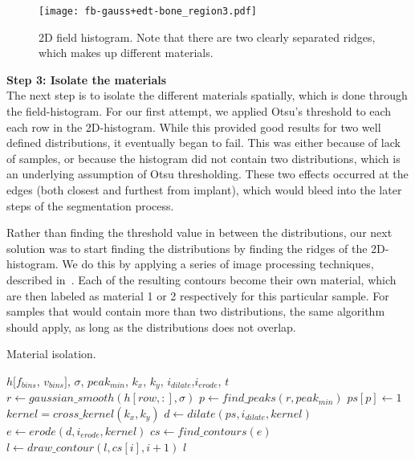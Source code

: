 \begin{figure}
    \texttt{[image: fb-gauss+edt-bone\_region3.pdf]}
    \caption{2D field histogram. Note that there are two clearly separated ridges, which makes up
    different materials.}
    \label{fig:field-hist}
\end{figure}

\vspace{\baselineskip}
\noindent\textbf{Step 3: Isolate the materials} \\
The next step is to isolate the different materials spatially, which is done through the field-histogram.
For our first attempt, we applied Otsu's threshold to each each row in the 2D-histogram. While this
provided good results for two well defined distributions, it eventually began to fail. This was either
because of lack of samples, or because the histogram did not contain two distributions, which is an
underlying assumption of Otsu thresholding. These two effects occurred at the edges (both closest and
furthest from implant), which would bleed into the later steps of the segmentation process.

Rather than finding the threshold value in between the distributions, our next solution was to start
finding the distributions by finding the ridges of the 2D-histogram. We do this by applying a series
of image processing techniques, described in~. Each of the resulting contours
become their own material, which are then labeled as material 1 or 2 respectively for this particular
sample. For samples that would contain more than two distributions, the same algorithm should apply,
as long as the distributions does not overlap.

\begin{algorithm}
    \caption{Material isolation.}
    \label{alg:material}
    \begin{algorithmic}
         {$h[f_{bins}$, $v_{bins}]$, $\sigma$, $peak_{min}$, $k_x$, $k_y$, \newline \indent \indent $i_{dilate}$,$i_{erode}$, $t$}
                \State $r \gets gaussian\_smooth(h[row,:], \sigma)$
                \State $p \gets find\_peaks(r, peak_{min})$
                \State $ps[p] \gets 1$
            \EndFor
            \State $kernel = cross\_kernel(k_x, k_y)$
            \State $d \gets dilate(ps, i_{dilate}, kernel)$
            \State $e \gets erode(d, i_{erode}, kernel)$
            \State $cs \gets find\_contours(e)$
                    \State $l \gets draw\_contour(l, cs[i], i+1)$
                \EndIf
            \EndFor
            \Return $l$
        \EndFunction
    \end{algorithmic}
\end{algorithm}


